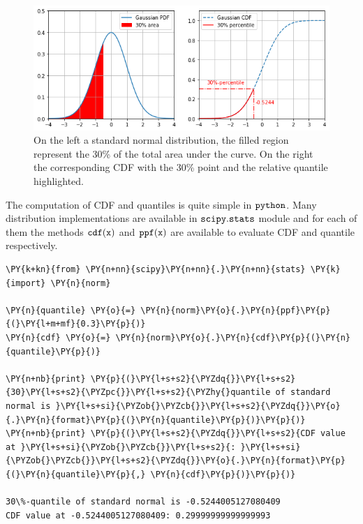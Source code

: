 \begin{figure}[htb]
	\centering
	\includegraphics[width=1.\textwidth]{figures/percentile.png}
	\caption{On the left a standard normal distribution, the filled region represent the 30\% of the total area
		under the curve. On the right the corresponding CDF with the 30\% point and the relative quantile highlighted.}
	\label{fig:percentile}
\end{figure}

The computation of CDF and quantiles is quite simple in \(\tt{python}\).
Many distribution implementations are available in \(\tt{scipy.stats}\)
module and for each of them the methods \(\tt{cdf(x)}\) and
\(\tt{ppf(x)}\) are available to evaluate CDF and quantile respectively.

\begin{tcolorbox}[breakable, size=fbox, boxrule=1pt, pad at break*=1mm,colback=cellbackground, colframe=cellborder]
\begin{Verbatim}[commandchars=\\\{\}]
\PY{k+kn}{from} \PY{n+nn}{scipy}\PY{n+nn}{.}\PY{n+nn}{stats} \PY{k}{import} \PY{n}{norm}
	
\PY{n}{quantile} \PY{o}{=} \PY{n}{norm}\PY{o}{.}\PY{n}{ppf}\PY{p}{(}\PY{l+m+mf}{0.3}\PY{p}{)}
\PY{n}{cdf} \PY{o}{=} \PY{n}{norm}\PY{o}{.}\PY{n}{cdf}\PY{p}{(}\PY{n}{quantile}\PY{p}{)}
	
\PY{n+nb}{print} \PY{p}{(}\PY{l+s+s2}{\PYZdq{}}\PY{l+s+s2}{30}\PY{l+s+s2}{\PYZpc{}}\PY{l+s+s2}{\PYZhy{}quantile of standard normal is }\PY{l+s+si}{\PYZob{}\PYZcb{}}\PY{l+s+s2}{\PYZdq{}}\PY{o}{.}\PY{n}{format}\PY{p}{(}\PY{n}{quantile}\PY{p}{)}\PY{p}{)}
\PY{n+nb}{print} \PY{p}{(}\PY{l+s+s2}{\PYZdq{}}\PY{l+s+s2}{CDF value at }\PY{l+s+si}{\PYZob{}\PYZcb{}}\PY{l+s+s2}{: }\PY{l+s+si}{\PYZob{}\PYZcb{}}\PY{l+s+s2}{\PYZdq{}}\PY{o}{.}\PY{n}{format}\PY{p}{(}\PY{n}{quantile}\PY{p}{,} \PY{n}{cdf}\PY{p}{)}\PY{p}{)}
	
30\%-quantile of standard normal is -0.5244005127080409
CDF value at -0.5244005127080409: 0.29999999999999993
\end{Verbatim}
\end{tcolorbox}

